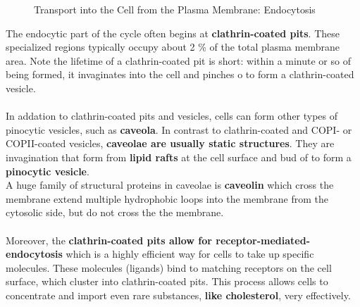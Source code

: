 \documentclass[../main.tex]{subfiles}
\begin{document}
\begin{figure}[H]
	\centering
	\caption{Transport into the Cell from the Plasma Membrane: Endocytosis}
\end{figure}

The endocytic part of the cycle often begins at \textbf{clathrin-coated pits}. These specialized regions typically occupy about 2 \% of the total plasma membrane area. Note the lifetime of a clathrin-coated pit is short: within a minute or so of being formed, it invaginates into the cell and pinches o to form a clathrin-coated vesicle. \\
\\
In addation to clathrin-coated pits and vesicles, cells can form other types of pinocytic vesicles, such as \textbf{\gls{caveola}}. In contrast to clathrin-coated and COPI- or COPII-coated vesicles, \textbf{caveolae are usually static structures}. They are invagination that form from \textbf{lipid rafts} at the cell surface and bud of to form a \textbf{pinocytic vesicle}. \\
\indent A huge family of structural proteins in caveolae is \textbf{\gls{caveolin}} which cross the membrane extend multiple hydrophobic loops into the membrane from the cytosolic side, but do not cross the the membrane.\\
\\
Moreover, the \textbf{clathrin-coated pits allow for \gls{receptor-mediated-endocytosis}} which is a highly efficient way for cells to take up specific molecules. These molecules (ligands) bind to matching receptors on the cell surface, which cluster into clathrin-coated pits. This process allows cells to concentrate and import even rare substances, \textbf{like cholesterol}, very effectively.
\end{document}
